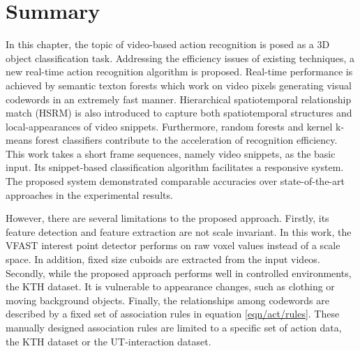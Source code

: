 \section{Summary}
\label{sec/act/discussion}
In this chapter, the topic of video-based action recognition is posed as a 3D object classification task. 
Addressing the efficiency issues of existing techniques, a new real-time action recognition algorithm is proposed. 
Real-time performance is achieved by semantic texton forests which work on video pixels generating visual codewords in an extremely fast manner. Hierarchical spatiotemporal relationship match (HSRM) is also introduced to capture both spatiotemporal structures and local-appearances of video snippets. 
Furthermore, random forests and kernel k-means forest classifiers contribute to the acceleration of recognition efficiency. 
This work takes a short frame sequences, namely video snippets, as the basic input. Its snippet-based classification algorithm facilitates a responsive system. 
The proposed system demonstrated comparable accuracies over state-of-the-art approaches in the experimental results. 

However, there are several limitations to the proposed approach. Firstly, its feature detection and feature extraction are not scale invariant. In this work, the VFAST interest point detector performs on raw voxel values instead of a scale space. In addition, fixed size cuboids are extracted from the input videos. Secondly, while the proposed approach performs well in controlled environments, \eg the KTH dataset. It is vulnerable to appearance changes, such as clothing or moving background objects. Finally, the relationships among codewords are described by a fixed set of association rules in equation \ref{eqn/act/rules}. These manually designed association rules are limited to a specific set of action data, \eg the KTH dataset or the UT-interaction dataset.

